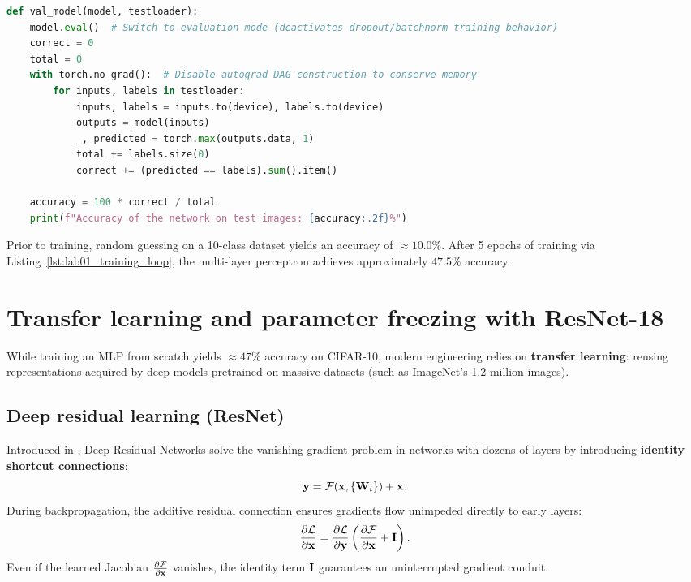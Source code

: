\documentclass[../labs.tex]{subfiles}
\begin{document}
\begin{lstlisting}[language=Python, caption={Validation routine with \texttt{model.eval()} and \texttt{torch.no\_grad()} (Cell 48).}, label={lst:lab01_val_model}]
def val_model(model, testloader):
    model.eval()  # Switch to evaluation mode (deactivates dropout/batchnorm training behavior)
    correct = 0
    total = 0
    with torch.no_grad():  # Disable autograd DAG construction to conserve memory
        for inputs, labels in testloader:
            inputs, labels = inputs.to(device), labels.to(device)
            outputs = model(inputs)
            _, predicted = torch.max(outputs.data, 1)
            total += labels.size(0)
            correct += (predicted == labels).sum().item()

    accuracy = 100 * correct / total
    print(f"Accuracy of the network on test images: {accuracy:.2f}%")
\end{lstlisting}

Prior to training, random guessing on a 10-class dataset yields an accuracy of $\approx 10.0\%$. After 5 epochs of training via Listing~\ref{lst:lab01_training_loop}, the multi-layer perceptron achieves approximately $47.5\%$ accuracy.


\section{Transfer learning and parameter freezing with ResNet-18}

While training an MLP from scratch yields $\approx 47\%$ accuracy on CIFAR-10, modern engineering relies on \textbf{transfer learning}: reusing representations acquired by deep models pretrained on massive datasets (such as ImageNet's 1.2 million images).

\subsection{Deep residual learning (ResNet)}
Introduced in \cite{he2016deep}, Deep Residual Networks solve the vanishing gradient problem in networks with dozens of layers by introducing \textbf{identity shortcut connections}:
\begin{equation}
\mathbf{y} = \mathcal{F}(\mathbf{x}, \{\mathbf{W}_i\}) + \mathbf{x}.
\end{equation}
During backpropagation, the additive residual connection ensures gradients flow unimpeded directly to early layers:
\begin{equation}
\frac{\partial \mathcal{L}}{\partial \mathbf{x}} = \frac{\partial \mathcal{L}}{\partial \mathbf{y}} \left( \frac{\partial \mathcal{F}}{\partial \mathbf{x}} + \mathbf{I} \right).
\end{equation}
Even if the learned Jacobian $\frac{\partial \mathcal{F}}{\partial \mathbf{x}}$ vanishes, the identity term $\mathbf{I}$ guarantees an uninterrupted gradient conduit.
\end{document}
